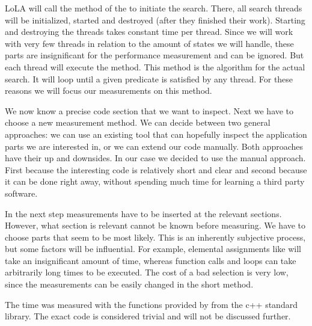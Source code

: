 LoLA will call the  method of the  to initiate the search. There, all search threads will be initialized, started and destroyed (after they finished their work). Starting and destroying the threads takes constant time per thread. Since we will work with very few threads in relation to the amount of states we will handle, these parts are insignificant for the performance measurement and can be ignored. But each thread will execute the  method. This method is the algorithm for the actual search. It will loop until a given predicate is satisfied by any thread. For these reasons we will focus our measurements on this method.

We now know a precise code section that we want to inspect. Next we have to choose a new measurement method. We can decide between two general approaches: we can use an existing tool that can hopefully inspect the application parts we are interested in, or we can extend our code manually. Both approaches have their up and downsides. In our case we decided to use the manual approach. First because the interesting code is relatively short and clear and second because it can be done right away, without spending much time for learning a third party software.

In the next step measurements have to be inserted at the relevant sections. However, what section is relevant cannot be known before measuring. We have to choose parts that seem to be most likely. This is an inherently subjective process, but some factors will be influential. For example, elemental assignments like  will take an insignificant amount of time, whereas function calls and loops can take arbitrarily long times to be executed. The cost of a bad selection is very low, since the measurements can be easily changed in the short method.

The time was measured with the functions provided by  from the c++ standard library. The exact code is considered trivial and will not be discussed further.

